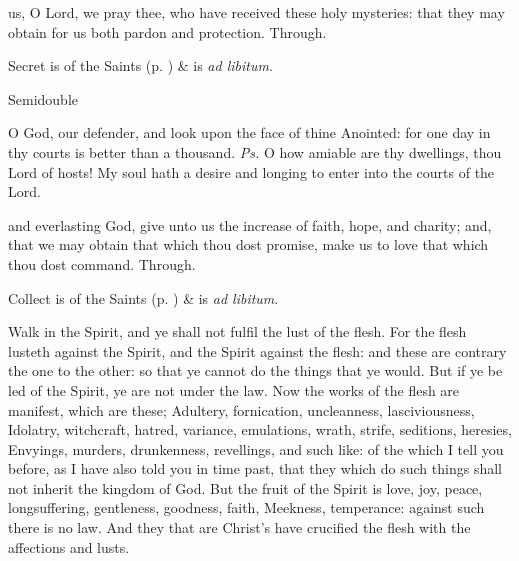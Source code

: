 \postcommunion
{} us, O Lord, we pray thee, who have received these holy mysteries: that they may obtain for us both pardon and protection. Through.
\begin{rubric}
     Secret is of the Saints (p. \pageref{SPSaints}) \&  is \emph{ad libitum}.
\end{rubric}

\begin{inhead}
{Semidouble}
\end{inhead}

\properantiphonfix

\introit
{} O God, our defender, and look upon the face of thine Anointed: for one day in thy courts is better than a thousand. \textit{Ps.} O how amiable are thy dwellings, thou Lord of hosts! My soul hath a desire and longing to enter into the courts of the Lord.

\collect
{} and everlasting God, give unto us the increase of faith, hope, and charity; and, that we may obtain that which thou dost promise, make us to love that which thou dost command. Through.
\begin{rubric}
     Collect is of the Saints (p. \pageref{SPSaints}) \&  is \emph{ad libitum}.
\end{rubric}

 Walk in the Spirit, and ye shall not fulfil the lust of the flesh. For the flesh lusteth against the Spirit, and the Spirit against the flesh: and these are contrary the one to the other: so that ye cannot do the things that ye would. But if ye be led of the Spirit, ye are not under the law. Now the works of the flesh are manifest, which are these; Adultery, fornication, uncleanness, lasciviousness, Idolatry, witchcraft, hatred, variance, emulations, wrath, strife, seditions, heresies, Envyings, murders, drunkenness, revellings, and such like: of the which I tell you before, as I have also told you in time past, that they which do such things shall not inherit the kingdom of God. But the fruit of the Spirit is love, joy, peace, longsuffering, gentleness, goodness, faith, Meekness, temperance: against such there is no law. And they that are Christ's have crucified the flesh with the affections and lusts.


